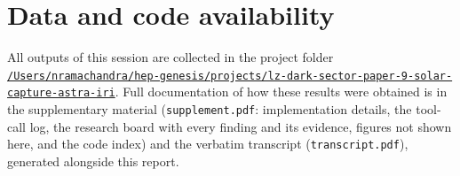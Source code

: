 \documentclass[11pt,a4paper]{article}
\begin{document}
\section*{Data and code availability}
All outputs of this session are collected in the project folder \href{file:///Users/nramachandra/hep-genesis/projects/lz-dark-sector-paper-9-solar-capture-astra-iri}{\texttt{/\allowbreak{}Users/\allowbreak{}nramachandra/\allowbreak{}hep-genesis/\allowbreak{}projects/\allowbreak{}lz-dark-sector-paper-9-solar-capture-astra-iri}}.
Full documentation of how these results were obtained is in the supplementary material (\texttt{supplement.pdf}: implementation details, the tool-call log, the research board with every finding and its evidence, figures not shown here, and the code index) and the verbatim transcript (\texttt{transcript.pdf}), generated alongside this report.
\end{document}
